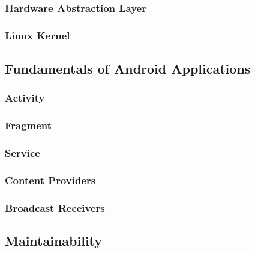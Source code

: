 \subsubsection{Hardware Abstraction Layer}


\subsubsection{Linux Kernel}


\subsection{Fundamentals of Android Applications}


\subsubsection{Activity}


\subsubsection{Fragment}


\subsubsection{Service}


\subsubsection{Content Providers}


\subsubsection{Broadcast Receivers}


\subsection{Maintainability}


